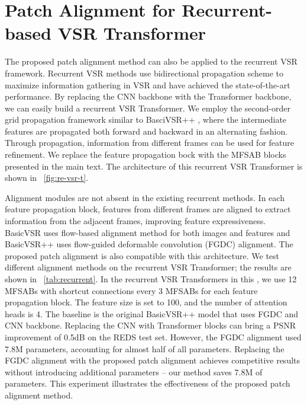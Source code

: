 \documentclass{article}
\begin{document}
\section{Patch Alignment for Recurrent-based VSR Transformer}
\label{apd:recurrent}
\vspace{-2mm}
The proposed patch alignment method can also be applied to the recurrent VSR framework.
Recurrent VSR methods \cite{chan2021basicvsr,chan2021basicvsr++} use bidirectional propagation scheme to maximize information gathering in VSR and have achieved the state-of-the-art performance.
By replacing the CNN backbone with the Transformer backbone, we can easily build a recurrent VSR Transformer.
We employ the second-order grid propagation framework similar to BasciVSR++ \cite{chan2021basicvsr++}, where the intermediate features are propagated both forward and backward in an alternating fashion.
Through propagation, information from different frames can be used for feature refinement.
We replace the feature propagation bock with the MFSAB blocks presented in the main text.
The architecture of this recurrent VSR Transformer is shown in \figurename~\ref{fig:re-vsr-t}.


Alignment modules are not absent in the existing recurrent methods.
In each feature propagation block, features from different frames are aligned to extract information from the adjacent frames, improving feature expressiveness.
BasicVSR \cite{chan2021basicvsr} uses flow-based alignment method for both images and features and BasicVSR++ \cite{chan2021basicvsr++} uses flow-guided deformable convolution (FGDC) alignment.
The proposed patch alignment is also compatible with this architecture.
We test different alignment methods on the recurrent VSR Transformer; the results are shown in \tablename~\ref{tab:recurrent}.
In the recurrent VSR Transformers in this \tablename, we use 12 MFSABs with shortcut connections every 3 MFSABs for each feature propagation block.
The feature size is set to 100, and the number of attention heads is 4.
The baseline is the original BasicVSR++ model that uses FGDC and CNN backbone.
Replacing the CNN with Transformer blocks can bring a PSNR improvement of 0.5dB on the REDS test set.
However, the FGDC alignment used 7.8M parameters, accounting for almost half of all parameters.
Replacing the FGDC alignment with the proposed patch alignment achieves competitive results without introducing additional parameters -- our method saves 7.8M of parameters.
This experiment illustrates the effectiveness of the proposed patch alignment method.
\end{document}
